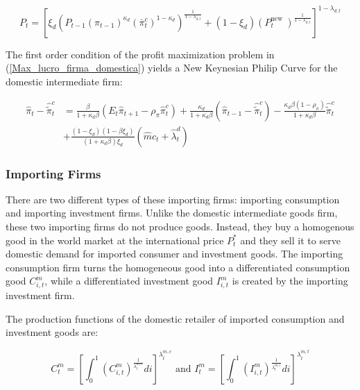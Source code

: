 \documentclass[12pt,oneside,a4paper]{article}
\begin{document}
\begin{equation}
    P_{t} =\left[\xi_{d}\left(P_{t-1}\left(\pi_{t-1}\right)^{\kappa_{d}}\left(\bar{\pi}_{t}^{c}\right)^{1-\kappa_{d}}\right)^{\frac{1}{1-\lambda_{d, t}}}+\left(1-\xi_{d}\right)\left(P_{t}^{\text {new }}\right)^{\frac{1}{1-\lambda_{d, t}}}\right]^{1-\lambda_{d, t}}
\end{equation}

The first order condition of the profit maximization problem in (\ref{Max_lucro_firma_domestica}) yields a New Keynesian Philip Curve for the domestic intermediate firm:

\begin{equation}
    \begin{aligned}
    \hat{\pi}_{t}-\hat{\tilde{\pi}}_{t}^{c} &=\frac{\beta}{1+\kappa_{d} \beta}\left(E_{t} \hat{\pi}_{t+1}-\rho_{\pi} \hat{\pi}_{t}^{c}\right)+\frac{\kappa_{d}}{1+\kappa_{d} \beta}\left(\hat{\pi}_{t-1}-\hat{\tilde{\pi}}_{t}^{c}\right)-\frac{\kappa_{d} \beta\left(1-\rho_{\pi}\right)}{1+\kappa_{d} \beta} \hat{\tilde{\pi}}_{t}^{c} \\
    &+\frac{\left(1-\xi_{d}\right)\left(1-\beta \xi_{d}\right)}{\left(1+\kappa_{d} \beta\right) \xi_{d}}\left(\hat{m} c_{t}+\hat{\lambda}_{t}^{d}\right)
    \end{aligned}
\end{equation}
\subsubsection{Importing Firms}
There are two different types of these importing firms: importing consumption and importing investment firms. Unlike the domestic intermediate goods firm, these two importing firms do not produce goods. Instead, they buy a homogenous good in the world market at the international price $P_t^{*}$ and they sell it to serve domestic demand for imported consumer and investment goods. The importing consumption firm turns the homogeneous good into a differentiated consumption good $C_{i,t}^{m}$, while a differentiated investment good $I_{i,t}^{m}$ is created by the importing investment firm.

The production functions of the domestic retailer of imported consumption and investment goods are: 

\begin{equation}
C_{t}^{m}=\left[\int_{0}^{1}\left(C_{i, t}^{m}\right)^{\frac{1}{\lambda_{t}^{m, c}}} d i\right]^{\lambda_{t}^{m, c}} \text { and } I_{t}^{m}=\left[\int_{0}^{1}\left(I_{i, t}^{m}\right)^{\frac{1}{\lambda_{t}^{m, i}}} d i\right]^{\lambda_{t}^{m, t}}
\end{equation}
\end{document}
